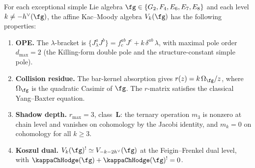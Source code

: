 \begin{proposition}
\label{prop:exceptional-class-L}
For each exceptional simple Lie algebra
$\fg \in \{G_2, F_4, E_6, E_7, E_8\}$ and each level
$k \ne -h^\vee(\fg)$, the affine Kac--Moody algebra $V_k(\fg)$
has the following properties:
\begin{enumerate}[label=\textup{(\roman*)},nosep]
\item \textbf{OPE.}
 The $\lambda$-bracket is
 $\{J^a_\lambda J^b\} = f^{ab}_c J^c + k\,\delta^{ab}\,\lambda$,
 with maximal pole order $d_{\max} = 2$
 \textup{(}the Killing-form double pole and the
 structure-constant simple pole\textup{)}.

\item \textbf{Collision residue.}
 The bar-kernel absorption gives
 $r(z) = k\,\Omega_\fg/z$, where $\Omega_\fg$ is the quadratic
 Casimir of $\fg$. The $r$-matrix satisfies the classical
 Yang--Baxter equation.

\item \textbf{Shadow depth.}
 $r_{\max} = 3$, class~$\mathbf{L}$: the ternary operation $m_3$
 is nonzero at chain level and vanishes on cohomology by the Jacobi
 identity, and $m_k = 0$ on cohomology for all $k \ge 3$.

\item \textbf{Koszul dual.}
 $V_k(\fg)^! \simeq V_{-k-2h^\vee}(\fg)$ at the Feigin--Frenkel
 dual level, with
 $\kappaChHodge(\fg) + \kappaChHodge(\fg)^! = 0$.


\end{enumerate}
\end{proposition}
